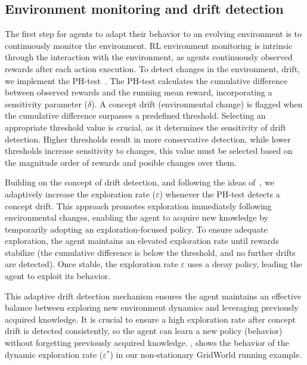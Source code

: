 \subsection{Environment monitoring and drift detection}

The first step for agents to adapt their behavior to an evolving environment is to continuously monitor 
the environment. \ac{RL} environment monitoring is intrinsic through the interaction with the 
environment, as agents continuously observed rewards after each action execution. To detect 
changes in the environment, \ie drift, we implement the 
PH-test~\cite{mignon2017adaptive,networkdynamicrl}. The PH-test calculates the cumulative 
difference between observed rewards and the running mean reward, incorporating a sensitivity 
parameter ($\delta$). A concept drift (environmental change) is flagged when the cumulative 
difference surpasses a predefined threshold. Selecting an appropriate threshold value is crucial, as it 
determines the sensitivity of drift detection. Higher thresholds result in more conservative detection, 
while lower thresholds increase sensitivity to changes, this value must be selected based on the 
magnitude order of rewards and posible changes over them.

Building on the concept of drift detection, and following the ideas of~\citet{mignon2017adaptive}, we 
adaptively increase the exploration rate ($\varepsilon$) whenever the PH-test detects a concept drift. 
This approach promotes exploration immediately following environmental changes, enabling the agent 
to acquire new knowledge by temporarily adopting an exploration-focused policy. To ensure adequate 
exploration, the agent maintains an elevated exploration rate until rewards stabilize (\ie the cumulative 
difference is below the threshold, and  no further drifts are detected). Once stable, the exploration rate 
$\varepsilon$ uses a decay policy, leading the agent to exploit its behavior.

This adaptive drift detection mechanism ensures the agent maintains an effective balance between 
exploring new environment dynamics and leveraging previously acquired knowledge. It is crucial to 
ensure a high exploration rate after concept drift is detected consistently, so the agent can learn a 
new policy (\ie behavior) without forgetting previously acquired knowledge. , 
shows the behavior of the dynamic exploration rate ($\varepsilon^*$) in our non-stationary GridWorld 
running example.

